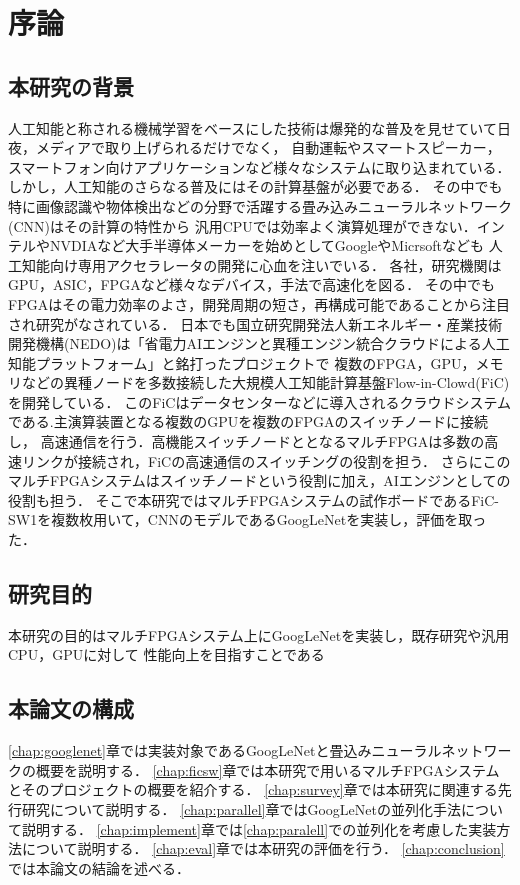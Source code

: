 \chapter{序論}
{
    \label{chap:introducion}

    \section{本研究の背景}
    \label{sec:backgroud}
    人工知能と称される機械学習をベースにした技術は爆発的な普及を見せていて日夜，メディアで取り上げられるだけでなく，
    自動運転やスマートスピーカー，スマートフォン向けアプリケーションなど様々なシステムに取り込まれている．
    しかし，人工知能のさらなる普及にはその計算基盤が必要である．
    その中でも特に画像認識や物体検出などの分野で活躍する畳み込みニューラルネットワーク(CNN)はその計算の特性から
    汎用CPUでは効率よく演算処理ができない．インテルやNVDIAなど大手半導体メーカーを始めとしてGoogleやMicrsoftなども
    人工知能向け専用アクセラレータの開発に心血を注いでいる．
    各社，研究機関はGPU，ASIC，FPGAなど様々なデバイス，手法で高速化を図る．
    その中でもFPGAはその電力効率のよさ，開発周期の短さ，再構成可能であることから注目され研究がなされている．
    日本でも国立研究開発法人新エネルギー・産業技術開発機構(NEDO)は「省電力AIエンジンと異種エンジン統合クラウドによる人工知能プラットフォーム」と銘打ったプロジェクトで
    複数のFPGA，GPU，メモリなどの異種ノードを多数接続した大規模人工知能計算基盤Flow-in-Clowd(FiC)を開発している．
    このFiCはデータセンターなどに導入されるクラウドシステムである.主演算装置となる複数のGPUを複数のFPGAのスイッチノードに接続し，
    高速通信を行う．高機能スイッチノードととなるマルチFPGAは多数の高速リンクが接続され，FiCの高速通信のスイッチングの役割を担う．
    さらにこのマルチFPGAシステムはスイッチノードという役割に加え，AIエンジンとしての役割も担う．
    そこで本研究ではマルチFPGAシステムの試作ボードであるFiC-SW1を複数枚用いて，CNNのモデルであるGoogLeNetを実装し，評価を取った．

    \section{研究目的}
    \label{sec:purpose}
    本研究の目的はマルチFPGAシステム上にGoogLeNetを実装し，既存研究や汎用CPU，GPUに対して
    性能向上を目指すことである

    \section{本論文の構成}
    \label{sec:composition}
    \ref{chap:googlenet}章では実装対象であるGoogLeNetと畳込みニューラルネットワークの概要を説明する．
    \ref{chap:ficsw}章では本研究で用いるマルチFPGAシステムとそのプロジェクトの概要を紹介する．
    \ref{chap:survey}章では本研究に関連する先行研究について説明する．
    \ref{chap:parallel}章ではGoogLeNetの並列化手法について説明する．
    \ref{chap:implement}章では\ref{chap:paralell}での並列化を考慮した実装方法について説明する． 
    \ref{chap:eval}章では本研究の評価を行う． 
    \ref{chap:conclusion}では本論文の結論を述べる．
}

